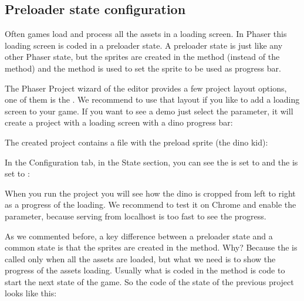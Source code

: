 \documentclass[letterpaper,10pt,english]{sphinxmanual}
\begin{document}
\subsection{Preloader state configuration}
\label{\detokenize{canvas:preloader-state-configuration}}
Often games load and process all the assets in a loading screen. In Phaser this loading screen is coded in a preloader state.
A preloader state is just like any other Phaser state, but the sprites are created in the  method (instead of the  method) and the  method is used to set the sprite to be used as progress bar.

The Phaser Project wizard of the editor provides a few project layout options, one of them is the . We recommend to use that layout if you like to add a loading screen to your game. If you want to see a demo just select the  parameter, it will create a project with a loading screen with a dino progress bar:

\noindent{}

The created project contains a  file with the preload sprite (the dino kid):

\noindent{}

In the Configuration tab, in the State section, you can see the  is set to  and the  is set to :

\noindent{}

When you run the project you will see how the dino is cropped from left to right as a progress of the loading. We recommend to test it on Chrome and enable the  parameter, because serving from localhost is too fast to see the progress.

As we commented before, a key difference between a preloader state and a common state is that the sprites are created in the  method. Why? Because the  is called only when all the assets are loaded, but what we need is to show the progress of the assets loading. Usually what is coded in the  method is code to start the next state of the game. So the code of the  state of the previous project looks like this:
\end{document}
